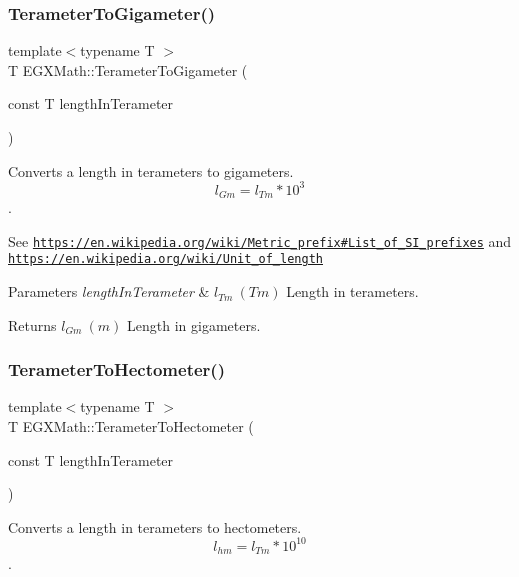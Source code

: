 \subsubsection{\texorpdfstring{Terameter\+To\+Gigameter()}{TerameterToGigameter()}}
{\footnotesize\ttfamily template$<$typename T $>$ \\
T E\+G\+X\+Math\+::\+Terameter\+To\+Gigameter (\begin{DoxyParamCaption}\item[{const T}]{length\+In\+Terameter }\end{DoxyParamCaption})}



Converts a length in terameters to gigameters. \[ l_{Gm}=l_{Tm} * 10^{3} \]. 

See \href{https://en.wikipedia.org/wiki/Metric_prefix#List_of_SI_prefixes}{\tt https\+://en.\+wikipedia.\+org/wiki/\+Metric\+\_\+prefix\#\+List\+\_\+of\+\_\+\+S\+I\+\_\+prefixes} and \href{https://en.wikipedia.org/wiki/Unit_of_length}{\tt https\+://en.\+wikipedia.\+org/wiki/\+Unit\+\_\+of\+\_\+length} 
\begin{DoxyParams}{Parameters}
{\em length\+In\+Terameter} & $ l_{Tm}\ (Tm)$ Length in terameters. \\
\hline
\end{DoxyParams}
\begin{DoxyReturn}{Returns}
$ l_{Gm}\ (m)$ Length in gigameters. 
\end{DoxyReturn}
\mbox{\label{group___e_g_x_math-_conversions-_length_conversions-_s_i-_terameter-_s_i_ga8e0944895887a45b1e2218ae7a511e4f}} 
\subsubsection{\texorpdfstring{Terameter\+To\+Hectometer()}{TerameterToHectometer()}}
{\footnotesize\ttfamily template$<$typename T $>$ \\
T E\+G\+X\+Math\+::\+Terameter\+To\+Hectometer (\begin{DoxyParamCaption}\item[{const T}]{length\+In\+Terameter }\end{DoxyParamCaption})}



Converts a length in terameters to hectometers. \[ l_{hm}=l_{Tm} * 10^{10} \]. 


